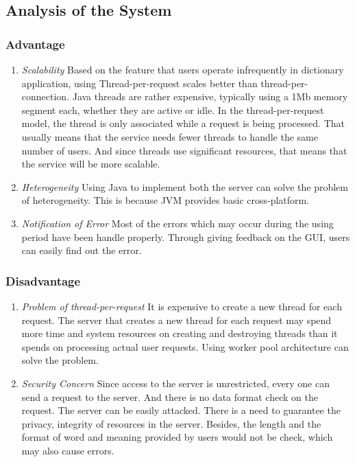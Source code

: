 \documentclass[a4paper]{article}
\begin{document}
\subsection{Analysis of the System}
\subsubsection{Advantage}
\begin{enumerate}
\item \textit{Scalability}
Based on the feature that users operate infrequently in dictionary application, using Thread-per-request scales better than thread-per-connection. Java threads are rather expensive, typically using a 1Mb memory segment each, whether they are active or idle. In the thread-per-request model, the thread is only associated while a request is being processed. That usually means that the service needs fewer threads to handle the same number of users. And since threads use significant resources, that means that the service will be more scalable.

\item \textit{Heterogeneity}
Using Java to implement both the server can solve the problem of heterogeneity. This is because JVM provides basic cross-platform.

\item \textit{Notification of Error}
Most of the errors which may occur during the using period have been handle properly. Through giving feedback on the GUI, users can easily find out the error.
\end{enumerate}

\subsubsection{Disadvantage}
\begin{enumerate}
\item \textit{Problem of thread-per-request}
It is expensive to create a new thread for each request. The server that creates a new thread for each request may spend more time and system resources on creating and destroying threads than it spends on processing actual user requests. Using worker pool architecture can solve the problem.

\item \textit{Security Concern}
Since access to the server is unrestricted, every one can send a request to the server. And there is no data format check on the request. The server can be easily attacked. There is a need to guarantee the privacy, integrity of resources in the server. Besides, the length and the format of word and meaning provided by users would not be check, which may also cause errors.
\end{enumerate}
\end{document}
